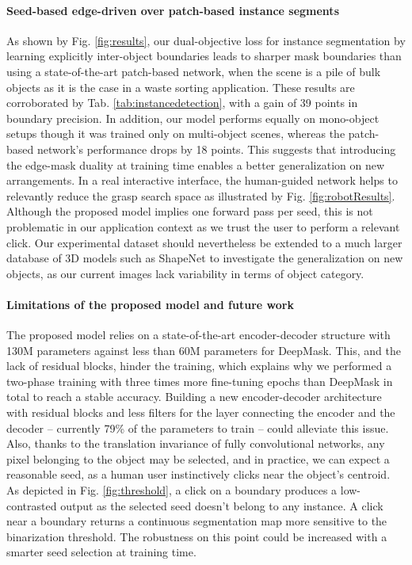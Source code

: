 \documentclass[runningheads,a4paper]{llncs}
\begin{document}
\paragraph{Seed-based edge-driven over patch-based instance segments}

As shown by Fig. \ref{fig:results}, our dual-objective loss for instance segmentation by learning explicitly inter-object boundaries leads to sharper mask boundaries than using a state-of-the-art patch-based network, when the scene is a pile of bulk objects as it is the case in a waste sorting application. These results are corroborated by Tab. \ref{tab:instancedetection}, with a gain of 39 points in boundary precision. In addition, our model performs equally on mono-object setups though it was trained only on multi-object scenes, whereas the patch-based network's performance drops by 18 points. This suggests that introducing the edge-mask duality at training time enables a better generalization on new arrangements. In a real interactive interface, the human-guided network helps to relevantly reduce the grasp search space as illustrated by Fig. \ref{fig:robotResults}. Although the proposed model implies one forward pass per seed, this is not problematic in our application context as we trust the user to perform a relevant click. Our experimental dataset should nevertheless be extended to a much larger database of 3D models such as ShapeNet \cite{ChangFGHHLSSSSX15} to investigate the generalization on new objects, as our current images lack variability in terms of object category.

\paragraph{Limitations of the proposed model and future work}

The proposed model relies on a state-of-the-art encoder-decoder structure with 130M parameters against less than 60M parameters for DeepMask. This, and the lack of residual blocks, hinder the training, which explains why we performed a two-phase training with three times more fine-tuning epochs than DeepMask in total to reach a stable accuracy. Building a new encoder-decoder architecture with residual blocks and less filters for the layer connecting the encoder and the decoder -- currently 79\% of the parameters to train -- could alleviate this issue. Also, thanks to the translation invariance of fully convolutional networks, any pixel belonging to the object may be selected, and in practice, we can expect a reasonable seed, as a human user instinctively clicks near the object's centroid. As depicted in Fig. \ref{fig:threshold}, a click on a boundary produces a low-contrasted output as the selected seed doesn't belong to any instance. A click near a boundary returns a continuous segmentation map more sensitive to the binarization threshold. The robustness on this point could be increased with a smarter seed selection at training time.
\end{document}
